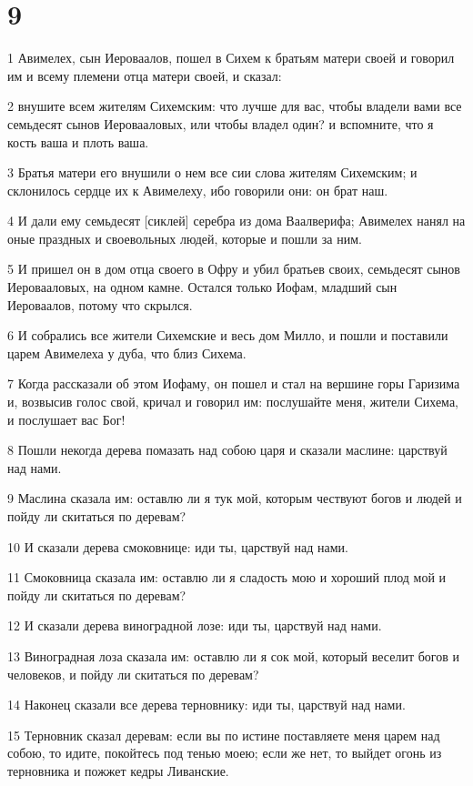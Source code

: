 \chapter{9}

\par 1 Авимелех, сын Иероваалов, пошел в Сихем к братьям матери своей и говорил им и всему племени отца матери своей, и сказал:
\par 2 внушите всем жителям Сихемским: что лучше для вас, чтобы владели вами все семьдесят сынов Иеровааловых, или чтобы владел один? и вспомните, что я кость ваша и плоть ваша.
\par 3 Братья матери его внушили о нем все сии слова жителям Сихемским; и склонилось сердце их к Авимелеху, ибо говорили они: он брат наш.
\par 4 И дали ему семьдесят [сиклей] серебра из дома Ваалверифа; Авимелех нанял на оные праздных и своевольных людей, которые и пошли за ним.
\par 5 И пришел он в дом отца своего в Офру и убил братьев своих, семьдесят сынов Иеровааловых, на одном камне. Остался только Иофам, младший сын Иероваалов, потому что скрылся.
\par 6 И собрались все жители Сихемские и весь дом Милло, и пошли и поставили царем Авимелеха у дуба, что близ Сихема.
\par 7 Когда рассказали об этом Иофаму, он пошел и стал на вершине горы Гаризима и, возвысив голос свой, кричал и говорил им: послушайте меня, жители Сихема, и послушает вас Бог!
\par 8 Пошли некогда дерева помазать над собою царя и сказали маслине: царствуй над нами.
\par 9 Маслина сказала им: оставлю ли я тук мой, которым чествуют богов и людей и пойду ли скитаться по деревам?
\par 10 И сказали дерева смоковнице: иди ты, царствуй над нами.
\par 11 Смоковница сказала им: оставлю ли я сладость мою и хороший плод мой и пойду ли скитаться по деревам?
\par 12 И сказали дерева виноградной лозе: иди ты, царствуй над нами.
\par 13 Виноградная лоза сказала им: оставлю ли я сок мой, который веселит богов и человеков, и пойду ли скитаться по деревам?
\par 14 Наконец сказали все дерева терновнику: иди ты, царствуй над нами.
\par 15 Терновник сказал деревам: если вы по истине поставляете меня царем над собою, то идите, покойтесь под тенью моею; если же нет, то выйдет огонь из терновника и пожжет кедры Ливанские.
